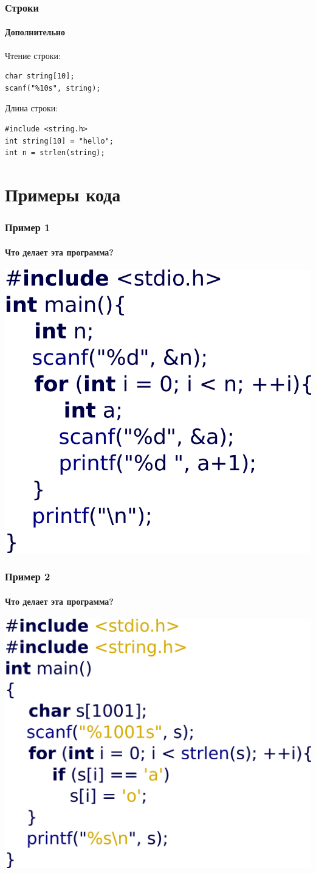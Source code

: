 \documentclass[12pt,pdf,hyperref={unicode}]{beamer}
\begin{document}
\begin{frame}[fragile]
\frametitle{Строки} 
\framesubtitle{Дополнительно}
Чтение строки:
\begin{lstlisting}
char string[10];
scanf("%10s", string);
\end{lstlisting}
Длина строки:
\begin{lstlisting}
#include <string.h>
int string[10] = "hello";
int n = strlen(string);
\end{lstlisting}
\end{frame}

\section{Примеры кода}

\begin{frame}[fragile]
\frametitle{Пример 1} 
\framesubtitle{Что делает эта программа?}
\begin{center}
\includegraphics[width=0.62\linewidth]{images/example1.png}
\end{center}
\end{frame}

\begin{frame}[fragile]
\frametitle{Пример 2} 
\framesubtitle{Что делает эта программа?}
\begin{center}
\includegraphics[width=0.62\linewidth]{images/example2.png}
\end{center}
\end{frame}
\end{document}
